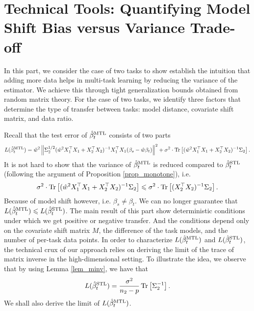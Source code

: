 \section{Technical Tools: Quantifying Model Shift Bias versus Variance Trade-off}\label{sec_main}

In this part, we consider the case of two tasks to show  establish the intuition that adding more data helps in multi-task learning by reducing the variance of the estimator.
We achieve this through tight generalization bounds obtained from random matrix theory.
For the case of two tasks, we identify three factors that determine the type of transfer between tasks: model distance, covariate shift matrix, and data ratio.

Recall that the test error of $\hat{\beta}_{t}^{\text{MTL}}$ consists of two parts
\begin{align}
	L(\hat{\beta}_t^{\text{MTL}}) = \hat{w}^2 \left\| \Sigma_2^{1/2} (\hat{w}^2 X_1^{\top}X_1 + X_2^{\top}X_2)^{-1}X_1^{\top}X_1 (\beta_s - \hat{w}\beta_t) \right\|^2 + \sigma^2\cdot \operatorname{Tr}\left[(\hat{w}^2 X_1^{\top}X_1 + X_2^{\top}X_2)^{-1}\Sigma_2\right]. \label{eq_te_model_shift}
\end{align}
It is not hard to show that the variance of $\hat{\beta}_t^{\text{MTL}}$ is reduced compared to $\hat{\beta}_t^{\text{STL}}$ (following the argument of Proposition \ref{prop_monotone}), i.e.
\[ \sigma^2\cdot \operatorname{Tr}\left[(\hat{w}^2 X_1^{\top}X_1 + X_2^{\top}X_2)^{-1}\Sigma_2\right] \leqslant \sigma^2\cdot \operatorname{Tr}\left[(X_2^{\top}X_2)^{-1}\Sigma_2\right]. \]
Because of model shift however, i.e. $\beta_s \neq \beta_t$.
We can no longer guarantee that $L(\hat{\beta}_{t}^{\text{MTL}}) \leqslant L(\hat{\beta}_t^{\text{STL}})$.
The main result of this part show deterministic conditions under which we get positive or negative transfer.
And the conditions depend only on the covariate shift matrix $M$, the difference of the task models, and the number of per-task data points.
In order to characterize $L(\hat{\beta}_t^{\text{MTL}})$ and $L(\hat{\beta}_t^{\text{STL}})$, the technical crux of our approach relies on deriving the limit of the trace of matrix inverse in the high-dimensional setting.
To illustrate the idea, we observe that by using Lemma \ref{lem_minv}, we have that
\[ L(\hat{\beta}_t^{\text{STL}}) = \frac{\sigma^2}{n_2 - p}\operatorname{Tr}\left[\Sigma_2^{-1}\right]. \]
We shall also derive the limit of $L(\hat{\beta}_t^{\text{MTL}})$.

